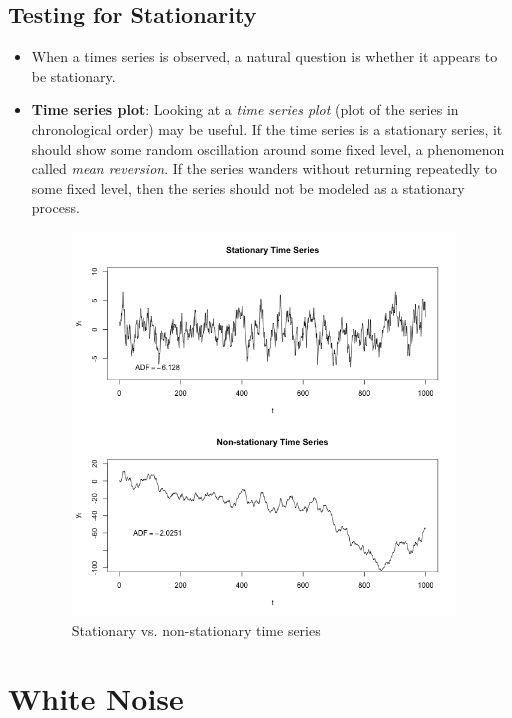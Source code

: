 \documentclass[11pt]{article}
\begin{document}
\subsection{Testing for Stationarity}
\begin{itemize}
    \item When a times series is observed, a natural question is whether it appears to be 
    stationary. 
    
    \item \textbf{Time series plot}:
    Looking at a \textit{time series plot} (plot of the series in chronological 
    order) may be useful. If the time series is a stationary series, it should show some random 
    oscillation around some fixed level, a phenomenon called \textit{mean reversion}. If the 
    series wanders without returning repeatedly to some fixed level, then the series should not
    be modeled as a stationary process. 
 
    \begin{figure}[H] 
         \centering 
         \includegraphics[width=4in]{imgs/stationary_vs_nonstationary.png}
         \caption{Stationary vs. non-stationary time series}
     \end{figure}
\end{itemize}

\section{White Noise}
\end{document}
